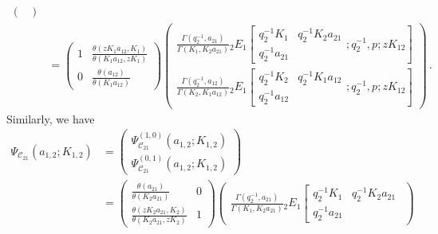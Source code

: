 \begin{lemma}
\begin{align}
\begin{pmatrix}
        \end{pmatrix}
        \nonumber \\
        & = 
        \begin{pmatrix}
            1 & \displaystyle \frac{\theta(z K_1 a_{12},K_1)}{\theta(K_1 a_{12},z K_1) } \\ 
            0 & \displaystyle \frac{\theta(a_{12}) }{\theta(K_1 a_{12}) }
        \end{pmatrix}
        \begin{pmatrix}
        \displaystyle 
        \frac{\Gamma(q_2^{-1},a_{21})}{\Gamma(K_1,K_2 a_{21})} {_2 E_1}
        \left[
        \begin{matrix}
            q_2^{-1} K_1 & q_2^{-1} K_2 a_{21} \\ q_2^{-1} a_{21}
        \end{matrix} ; q_2^{-1}, p ; z K_{12} 
        \right] \\[1.5em]
        \displaystyle 
        \frac{\Gamma(q_2^{-1},a_{12})}{\Gamma(K_2,K_1 a_{12})} {_2 E_1}
        \left[
        \begin{matrix}
            q_2^{-1} K_2 & q_2^{-1} K_1 a_{12} \\ q_2^{-1} a_{12}
        \end{matrix} ; q_2^{-1}, p ; z K_{12} 
        \right]
        \end{pmatrix}
        \, .
    \end{align}
    Similarly, we have
    \begin{align}
        \Psi_{\mathscr{C}_{21}}(a_{1,2};K_{1,2}) & = 
        \begin{pmatrix}
            \Psi_{\mathscr{C}_{21}}^{(1,0)}(a_{1,2};K_{1,2}) \\ \Psi_{\mathscr{C}_{21}}^{(0,1)}(a_{1,2};K_{1,2})
        \end{pmatrix}
        \nonumber \\
        & = 
        \begin{pmatrix}
            \displaystyle \frac{\theta(a_{21})}{\theta(K_2 a_{21}) } & 0 \\
            \displaystyle \frac{\theta(z K_2 a_{21},K_2)}{\theta(K_2 a_{21},z K_2) } & 1
        \end{pmatrix}
        \begin{pmatrix}
        \displaystyle \frac{\Gamma(q_2^{-1},a_{21})}{\Gamma(K_1,K_2 a_{21})} {_2 E_1}
        \left[
        \begin{matrix}
            q_2^{-1} K_1 & q_2^{-1} K_2 a_{21} \\ q_2^{-1} a_{21}

\end{matrix}
\end{pmatrix}
\end{align}
\end{lemma}
